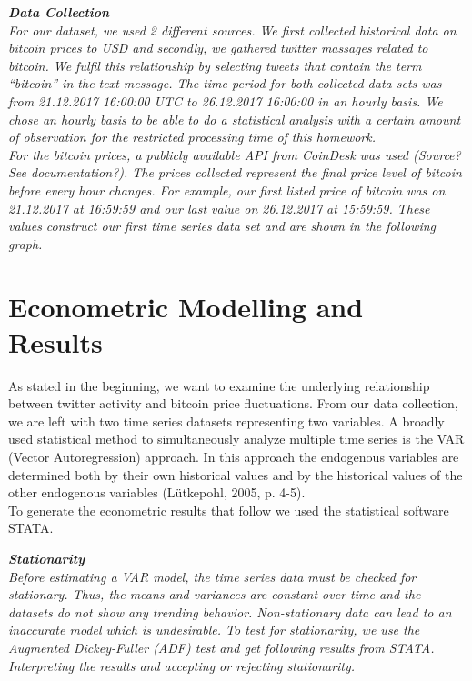 \documentclass[a4paper,american,12pt]{article}
\begin{document}
\begin{spacing}{1.2}
		\itshape\textbf {Data Collection}\\
		\textnormal {For our dataset, we used 2 different sources. We first collected historical data on bitcoin prices to USD and secondly, we gathered twitter massages related to bitcoin. We fulfil this relationship by selecting tweets that contain the term “bitcoin” in the text message. The time period for both collected data sets was from 21.12.2017 16:00:00 UTC to 26.12.2017 16:00:00 in an hourly basis. We chose an hourly basis to be able to do a statistical analysis with a certain amount of observation for the restricted processing time of this homework.\\
For the bitcoin prices, a publicly available API from CoinDesk was used (Source? See documentation?). The prices collected represent the final price level of bitcoin before every hour changes. For example, our first listed price of bitcoin was on 21.12.2017 at 16:59:59 and our last value on 26.12.2017 at 15:59:59. These values construct our first time series data set and are shown in the following graph.\\}
				
		\clearpage
		
		\section{Econometric Modelling and Results}
		\textnormal {As stated in the beginning, we want to examine the underlying relationship between twitter activity and bitcoin price fluctuations. From our data collection, we are left with two time series datasets representing two variables. A broadly used statistical method to simultaneously analyze multiple time series is the VAR (Vector Autoregression) approach. In this approach the endogenous variables are determined both by their own historical values and by the historical values of the other endogenous variables (Lütkepohl, 2005, p. 4-5).\\
To generate the econometric results that follow we used the statistical software STATA.}

		\itshape\textbf {Stationarity}\\
		\textnormal {Before estimating a VAR model, the time series data must be checked for stationary. Thus, the means and variances are constant over time and the datasets do not show any trending behavior. Non-stationary data can lead to an inaccurate model which is undesirable. To test for stationarity, we use the Augmented Dickey-Fuller (ADF) test and get following results from STATA.\\
Interpreting the results and accepting or rejecting stationarity.}


\end{spacing}
\end{document}
